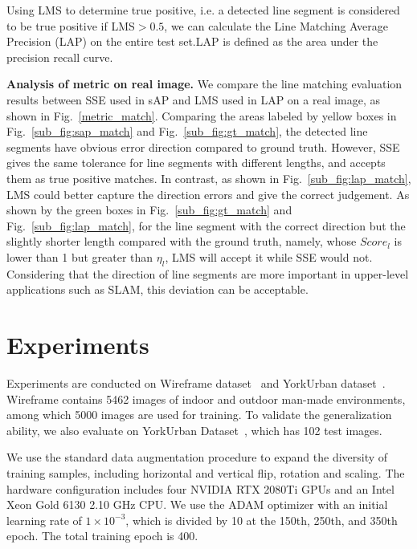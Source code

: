 \documentclass[runningheads]{llncs}
\begin{document}
Using LMS to determine true positive, i.e. a detected line segment is considered to be true positive if LMS$>0.5$, we can calculate the Line Matching Average Precision (LAP) on the entire test set.LAP is defined as the area under the precision recall curve. 

\textbf{Analysis of metric on real image.} We compare the line matching evaluation results between SSE used in sAP and LMS used in LAP on a real image, as shown in Fig.~\ref{metric_match}. Comparing the areas labeled by yellow boxes in Fig.~\ref{sub_fig:sap_match} and Fig.~\ref{sub_fig:gt_match}, the detected line segments have obvious error direction compared to ground truth. However, SSE gives the same tolerance for line segments with different lengths, and accepts them as true positive matches. In contrast, as shown in Fig.~\ref{sub_fig:lap_match}, LMS could better capture the direction errors and give the correct judgement. As shown by the green boxes in Fig.~\ref{sub_fig:gt_match} and Fig.~\ref{sub_fig:lap_match}, for the line segment with the correct direction but the slightly shorter length compared with the ground truth, namely, whose $Score_l$ is lower than 1 but greater than $\eta_l$, LMS will accept it while SSE would not. Considering that the direction of line segments are more important in upper-level applications such as SLAM, this deviation can be acceptable.




\section{Experiments}

Experiments are conducted on Wireframe dataset~\cite{Wireframe} and YorkUrban dataset~\cite{York}. Wireframe contains 5462 images of indoor and outdoor man-made environments, among which 5000 images are used for training. To validate the generalization ability, we also evaluate on YorkUrban Dataset~\cite{York}, which has 102 test images.

We use the standard data augmentation procedure to expand the diversity of training samples, including horizontal and vertical flip, rotation and scaling.
The hardware configuration includes four NVIDIA RTX 2080Ti GPUs and an Intel Xeon Gold 6130 2.10 GHz CPU. We use the ADAM optimizer with an initial learning rate of $1\times 10^{-3}$, which is divided by 10 at the 150th, 250th, and 350th epoch. The total training epoch is 400.
\end{document}
